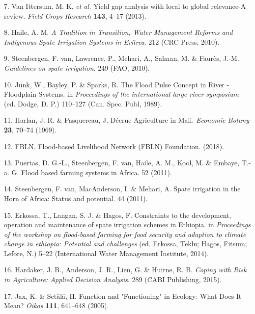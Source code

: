 \documentclass[11pt,preprint]{article}
\begin{document}
\leavevmode\hypertarget{ref-VanIttersum_et_al_2013}{}%
7. Van Ittersum, M. K. \emph{et al.} Yield gap analysis with local to
global relevance-A review. \emph{Field Crops Research} \textbf{143},
4--17 (2013).

\leavevmode\hypertarget{ref-Haile_2010}{}%
8. Haile, A. M. \emph{A Tradition in Transition, Water Management
Reforms and Indigenous Spate Irrigation Systems in Eritrea}. 212 (CRC
Press, 2010).

\leavevmode\hypertarget{ref-VanSteenbergen_et_al_2010}{}%
9. Steenbergen, F. van, Lawrence, P., Mehari, A., Salman, M. \& Faurès,
J.-M. \emph{Guidelines on spate irrigation}. 249 (FAO, 2010).

\leavevmode\hypertarget{ref-Junk_et_al_1989}{}%
10. Junk, W., Bayley, P. \& Sparks, R. The Flood Pulse Concept in River
- Floodplain Systems. in \emph{Proceedings of the international large
river symposium} (ed. Dodge, D. P.) 110--127 (Can. Spec. Publ, 1989).

\leavevmode\hypertarget{ref-Harlan_Pasquereau_1969}{}%
11. Harlan, J. R. \& Pasquereau, J. Décrue Agriculture in Mali.
\emph{Economic Botany} \textbf{23}, 70--74 (1969).

\leavevmode\hypertarget{ref-FBLN_2018}{}%
12. FBLN. Flood-based Livelihood Network (FBLN) Foundation. (2018).

\leavevmode\hypertarget{ref-Puertas_et_al_2011}{}%
13. Puertas, D. G.-L., Steenbergen, F. van, Haile, A. M., Kool, M. \&
Embaye, T.-a. G. Flood based farming systems in Africa. 52 (2011).

\leavevmode\hypertarget{ref-VanSteenbergen_et_al_2011}{}%
14. Steenbergen, F. van, MacAnderson, I. \& Mehari, A. Spate irrigation
in the Horn of Africa: Status and potential. 44 (2011).

\leavevmode\hypertarget{ref-Erkossa_et_al_2014}{}%
15. Erkossa, T., Langan, S. J. \& Hagos, F. Constraints to the
development, operation and maintenance of spate irrigation schemes in
Ethiopia. in \emph{Proceedings of the workshop on flood-based farming
for food security and adaption to climate change in ethiopia: Potential
and challenges} (ed. Erkossa, Teklu; Hagos, Fitsum; Lefore, N.) 5--22
(International Water Management Institute, 2014).

\leavevmode\hypertarget{ref-Hardaker_et_al_2015}{}%
16. Hardaker, J. B., Anderson, J. R., Lien, G. \& Huirne, R. B.
\emph{Coping with Risk in Agriculture: Applied Decision Analysis}. 289
(CABI Publishing, 2015).

\leavevmode\hypertarget{ref-Jax_and_Setala_2005}{}%
17. Jax, K. \& Setälä, H. Function and "Functioning" in Ecology: What
Does It Mean? \emph{Oikos} \textbf{111}, 641--648 (2005).
\end{document}
